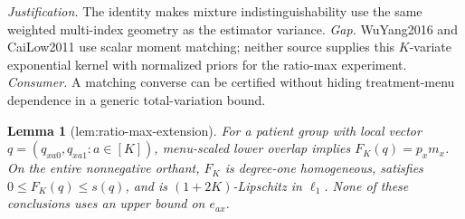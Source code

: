 \documentclass{article}
\newtheorem{lemma}{Lemma}
\begin{document}
\par\smallskip\noindent \textit{Justification.} The identity makes mixture indistinguishability use the same weighted multi-index geometry as the estimator variance. \textit{Gap.} WuYang2016 and CaiLow2011 use scalar moment matching; neither source supplies this \(K\)-variate exponential kernel with normalized priors for the ratio-max experiment. \textit{Consumer.} A matching converse can be certified without hiding treatment-menu dependence in a generic total-variation bound.

\begin{lemma}[lem:ratio-max-extension]\label{lem:ratio-max-extension}
For a patient group with local vector \(q=(q_{xa0},q_{xa1}:a\in[K])\), menu-scaled lower overlap implies \(F_K(q)=p_xm_x\). On the entire nonnegative orthant, \(F_K\) is degree-one homogeneous, satisfies \(0\le F_K(q)\le s(q)\), and is \((1+2K)\)-Lipschitz in \(\ell_1\). None of these conclusions uses an upper bound on \(e_{ax}\).
\end{lemma}
\end{document}
